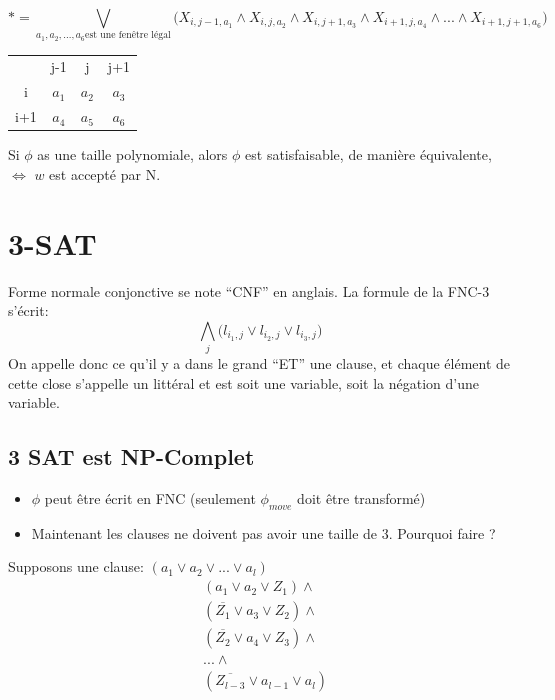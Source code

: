 \documentclass[a4paper,12pt]{article}
\begin{document}
    $$* = \bigvee\limits_{a_1, a_2, ..., a_6\text{est une fenêtre légal}} \big(X_{i, j-1, a_1} \wedge X_{i, j, a_2} \wedge X_{i, j+1, a_3} \wedge X_{i+1, j, a_4} \wedge ... \wedge X_{i+1, j+1, a_6}\big)$$

    \begin{table}[h]
      \centering
      \begin{tabular}{cccc}
			      & j-1                         & j                          & j+1                        \\ \cline{2-4}
      \multicolumn{1}{c|}{i}   & \multicolumn{1}{c|}{$a_1$} & \multicolumn{1}{c|}{$a_2$} & \multicolumn{1}{c|}{$a_3$} \\ \cline{2-4}
      \multicolumn{1}{c|}{i+1} & \multicolumn{1}{c|}{$a_4$} & \multicolumn{1}{c|}{$a_5$} & \multicolumn{1}{c|}{$a_6$} \\ \cline{2-4}
      \end{tabular}
    \end{table}

    Si $\phi$ as une taille polynomiale, alors $\phi$ est satisfaisable, de manière équivalente, $\Leftrightarrow$ $w$ est accepté par N.


\section{3-SAT}
  Forme normale conjonctive se note ``CNF'' en anglais.  La formule de la FNC-3 s'écrit:
  $$\bigwedge\limits_{j} \big(l_{i_1, j} \vee l_{i_2, j} \vee l_{i_3, j} \big)$$
  On appelle donc ce qu'il y a dans le grand ``ET'' une clause, et chaque élément de cette close s'appelle un littéral et est soit une variable, soit la négation d'une variable.

  \subsection{3 SAT est NP-Complet}
    \begin{itemize}
      \item $\phi$ peut être écrit en FNC (seulement $\phi_{move}$ doit être transformé)
      \item Maintenant les clauses ne doivent pas avoir une taille de 3. Pourquoi faire ?
    \end{itemize}

    Supposons une clause: $(a_1 \vee a_2 \vee ... \vee a_l)$
    \begin{align*}
      &(a_1 \vee a_2 \vee Z_1) \wedge \\
      &(\overline{Z_1} \vee a_3 \vee Z_2) \wedge \\
      &(\overline{Z_2} \vee a_4 \vee Z_3) \wedge \\
      &... \wedge\\
      &(\overline{Z_{l-3}} \vee a_{l-1} \vee a_l)
    \end{align*}
\end{document}
